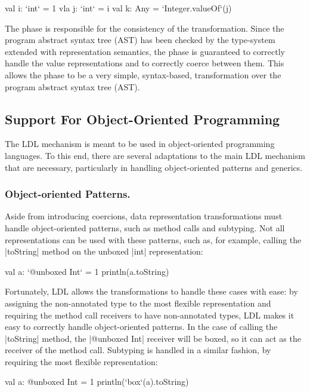 \begin{lstlisting-nobreak}
val i: `int` = 1
vla j: `int` = i
val k: Any = `Integer.valueOf`(j)
\end{lstlisting-nobreak}

The \commit{} phase is responsible for the consistency of the transformation. Since the program abstract syntax tree (AST) has been checked by the type-system extended with representation semantics, the \commit{} phase is guaranteed to correctly handle the value representations and to correctly coerce between them. This allows the \commit{} phase to be a very simple, syntax-based, transformation over the program abstract syntax tree (AST).

\subsection{Support For Object-Oriented Programming}

The LDL mechanism is meant to be used in object-oriented programming languages. To this end, there are several adaptations to the main LDL mechanism that are necessary, particularly in handling object-oriented patterns and generics.

\subsubsection{Object-oriented Patterns.} Aside from introducing coercions, data representation transformations must handle object-oriented patterns, such as method calls and subtyping. Not all representations can be used with these patterns, such as, for example, calling the |toString| method on the unboxed |int| representation:

\begin{lstlisting-nobreak}
val a: `@unboxed Int` = 1
println(a.toString)
\end{lstlisting-nobreak}

Fortunately, LDL allows the transformations to handle these cases with ease: by assigning the non-annotated type to the most flexible representation and requiring the method call receivers to have non-annotated types, LDL makes it easy to correctly handle object-oriented patterns. In the case of calling the |toString| method, the |@unboxed Int| receiver will be boxed, so it can act as the receiver of the method call. Subtyping is handled in a similar fashion, by requiring the most flexible representation:

\begin{lstlisting-nobreak}
val a: @unboxed Int = 1
println(`box`(a).toString)
\end{lstlisting-nobreak}

